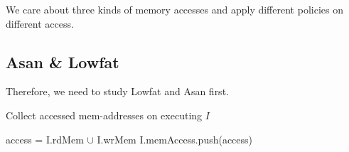We care about three kinds of memory accesses and apply different policies on different access.

\subsection{Asan \& Lowfat}
Therefore, we need to study Lowfat and Asan first.
























\begin{algorithm}
  \caption{Collect accessed mem-addresses on executing $I$}
  \footnotesize
  \begin{algorithmic}[1]

     
    \State access = I.rdMem $\cup$ I.wrMem
    \State I.memAccess.push(access)

    \EndFunction
  \end{algorithmic}
\end{algorithm}


